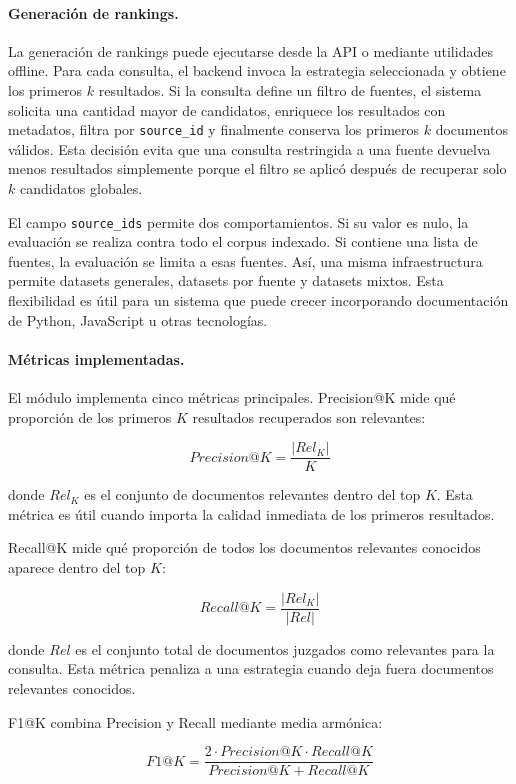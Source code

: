 \documentclass[11pt]{article}
\begin{document}
\paragraph{Generación de rankings.}
La generación de rankings puede ejecutarse desde la API o mediante utilidades offline. Para cada consulta, el backend invoca la estrategia seleccionada y obtiene los primeros \(k\) resultados. Si la consulta define un filtro de fuentes, el sistema solicita una cantidad mayor de candidatos, enriquece los resultados con metadatos, filtra por \texttt{source\_id} y finalmente conserva los primeros \(k\) documentos válidos. Esta decisión evita que una consulta restringida a una fuente devuelva menos resultados simplemente porque el filtro se aplicó después de recuperar solo \(k\) candidatos globales.

El campo \texttt{source\_ids} permite dos comportamientos. Si su valor es nulo, la evaluación se realiza contra todo el corpus indexado. Si contiene una lista de fuentes, la evaluación se limita a esas fuentes. Así, una misma infraestructura permite datasets generales, datasets por fuente y datasets mixtos. Esta flexibilidad es útil para un sistema que puede crecer incorporando documentación de Python, JavaScript u otras tecnologías.

\paragraph{Métricas implementadas.}
El módulo implementa cinco métricas principales. Precision@K mide qué proporción de los primeros \(K\) resultados recuperados son relevantes:

\[
Precision@K = \frac{|Rel_K|}{K}
\]

donde \(Rel_K\) es el conjunto de documentos relevantes dentro del top \(K\). Esta métrica es útil cuando importa la calidad inmediata de los primeros resultados.

Recall@K mide qué proporción de todos los documentos relevantes conocidos aparece dentro del top \(K\):

\[
Recall@K = \frac{|Rel_K|}{|Rel|}
\]

donde \(Rel\) es el conjunto total de documentos juzgados como relevantes para la consulta. Esta métrica penaliza a una estrategia cuando deja fuera documentos relevantes conocidos.

F1@K combina Precision y Recall mediante media armónica:

\[
F1@K = \frac{2 \cdot Precision@K \cdot Recall@K}{Precision@K + Recall@K}
\]
\end{document}
